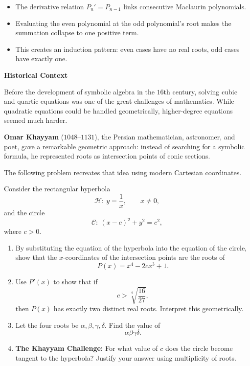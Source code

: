 \begin{takeaways}
\begin{itemize}[leftmargin=*]
\item The derivative relation $P_n'=P_{n-1}$ links consecutive Maclaurin polynomials.
\item Evaluating the even polynomial at the odd polynomial’s root makes the summation collapse to one positive term.
\item This creates an induction pattern: even cases have no real roots, odd cases have exactly one.
\end{itemize}
\end{takeaways}

\begin{problem}
\textbf{Historical Context}

Before the development of symbolic algebra in the $16$th century, solving cubic and quartic equations was one of the great challenges of mathematics. While quadratic equations could be handled geometrically, higher-degree equations seemed much harder.

\textbf{Omar Khayyam} ($1048$--$1131$), the Persian mathematician, astronomer, and poet, gave a remarkable geometric approach: instead of searching for a symbolic formula, he represented roots as intersection points of conic sections.

The following problem recreates that idea using modern Cartesian coordinates.

\medskip
\noindent Consider the rectangular hyperbola
\[
\mathcal H:\ y=\frac{1}{x},\qquad x\ne 0,
\]
and the circle
\[
\mathcal C:\ (x-c)^2+y^2=c^2,
\]
where $c>0$.

\begin{enumerate}[label=(\roman*)]
\item By substituting the equation of the hyperbola into the equation of the circle, show that the $x$-coordinates of the intersection points are the roots of
\[
P(x)=x^4-2cx^3+1.
\]
\item Use $P'(x)$ to show that if
\[
c>\sqrt[4]{\frac{16}{27}},
\]
then $P(x)$ has exactly two distinct real roots. Interpret this geometrically.
\item Let the four roots be $\alpha,\beta,\gamma,\delta$. Find the value of
\[
\alpha\beta\gamma\delta.
\]
\item \textbf{The Khayyam Challenge:} For what value of $c$ does the circle become tangent to the hyperbola? Justify your answer using multiplicity of roots.
\end{enumerate}
\end{problem}

